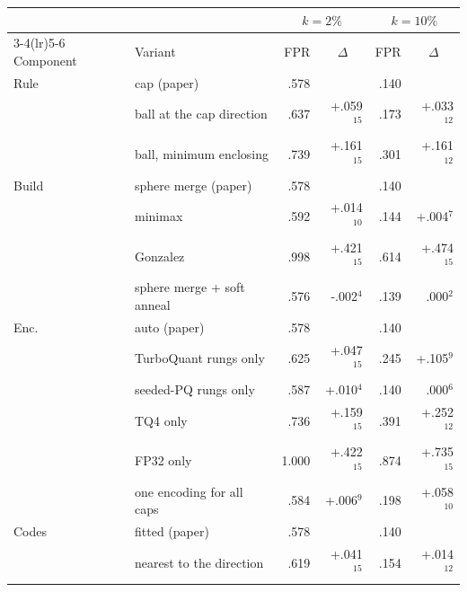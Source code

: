 \begin{tabular}{@{}llrrrr@{}}
\toprule
& & \multicolumn{2}{c}{$k=2\%$} & \multicolumn{2}{c}{$k=10\%$} \\
\cmidrule(lr){3-4}\cmidrule(lr){5-6}
Component & Variant & FPR & \multicolumn{1}{c}{$\Delta$} & FPR & \multicolumn{1}{c}{$\Delta$} \\
\midrule
Rule & cap (paper) & .578 &  & .140 &  \\
 & ball at the cap direction & .637 & +.059$^{15}$ & .173 & +.033$^{12}$ \\
 & ball, minimum enclosing & .739 & +.161$^{15}$ & .301 & +.161$^{12}$ \\
\addlinespace[2pt]
Build & sphere merge (paper) & .578 &  & .140 &  \\
 & minimax & .592 & +.014$^{10}$ & .144 & +.004$^{7}$ \\
 & Gonzalez & .998 & +.421$^{15}$ & .614 & +.474$^{15}$ \\
 & sphere merge + soft anneal & .576 & -.002$^{4}$ & .139 & .000$^{2}$ \\
\addlinespace[2pt]
Enc. & auto (paper) & .578 &  & .140 &  \\
 & TurboQuant rungs only & .625 & +.047$^{15}$ & .245 & +.105$^{9}$ \\
 & seeded-PQ rungs only & .587 & +.010$^{4}$ & .140 & .000$^{6}$ \\
 & TQ4 only & .736 & +.159$^{15}$ & .391 & +.252$^{12}$ \\
 & FP32 only & 1.000 & +.422$^{15}$ & .874 & +.735$^{15}$ \\
 & one encoding for all caps & .584 & +.006$^{9}$ & .198 & +.058$^{10}$ \\
\addlinespace[2pt]
Codes & fitted (paper) & .578 &  & .140 &  \\
 & nearest to the direction & .619 & +.041$^{15}$ & .154 & +.014$^{12}$ \\
\bottomrule
\end{tabular}
